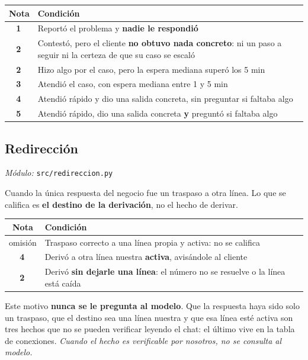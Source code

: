 \documentclass[11pt,a4paper]{article}
\newcommand{\cod}[1]{\texttt{\small #1}}
\newcommand{\est}[1]{\textbf{#1}\,\raisebox{0.5pt}{$\star$}}
\begin{document}
\begin{center}
\begin{tabularx}{\textwidth}{@{}cX@{}}
\toprule
\textbf{Nota} & \textbf{Condición} \\
\midrule
\est{1} & Reportó el problema y \textbf{nadie le respondió} \\
\est{2} & Contestó, pero el cliente \textbf{no obtuvo nada concreto}: ni un paso a
seguir ni la certeza de que su caso se escaló \\
\est{2} & Hizo algo por el caso, pero la espera mediana superó los 5 min \\
\est{3} & Atendió el caso, con espera mediana entre 1 y 5 min \\
\est{4} & Atendió rápido y dio una salida concreta, sin preguntar si faltaba algo \\
\est{5} & Atendió rápido, dio una salida concreta \textbf{y} preguntó si faltaba algo \\
\bottomrule
\end{tabularx}
\end{center}

\subsection{Redirección}
\emph{Módulo:} \cod{src/redireccion.py}

Cuando la única respuesta del negocio fue un traspaso a otra línea. Lo que se
califica es \textbf{el destino de la derivación}, no el hecho de derivar.

\begin{center}
\begin{tabularx}{\textwidth}{@{}cX@{}}
\toprule
\textbf{Nota} & \textbf{Condición} \\
\midrule
omisión & Traspaso correcto a una línea propia y activa: no se califica \\
\est{4} & Derivó a otra línea nuestra \textbf{activa}, avisándole al cliente \\
\est{2} & Derivó \textbf{sin dejarle una línea}: el número no se resuelve o la línea está caída \\
\bottomrule
\end{tabularx}
\end{center}

\begin{nota}
Este motivo \textbf{nunca se le pregunta al modelo}. Que la respuesta haya sido solo
un traspaso, que el destino sea una línea nuestra y que esa línea esté activa son
tres hechos que no se pueden verificar leyendo el chat: el último vive en la tabla de
conexiones. \emph{Cuando el hecho es verificable por nosotros, no se consulta al modelo.}
\end{nota}
\end{document}
